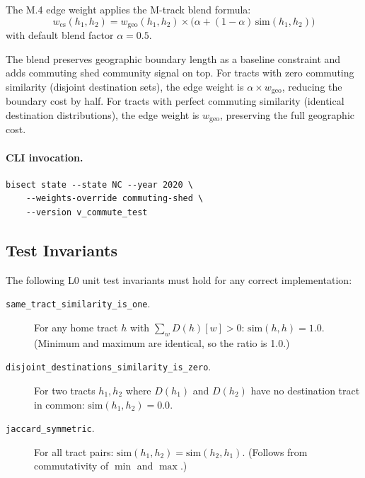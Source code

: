 The M.4 edge weight applies the M-track blend formula:
\begin{equation}
  w_{\mathrm{cs}}(h_1, h_2)
  = w_{\mathrm{geo}}(h_1, h_2) \times
    \bigl(\alpha + (1 - \alpha)\,\mathrm{sim}(h_1, h_2)\bigr)
  \label{eq:weight}
\end{equation}
with default blend factor $\alpha = 0.5$.

The blend preserves geographic boundary length as a baseline constraint and
adds commuting shed community signal on top.
For tracts with zero commuting similarity (disjoint destination sets),
the edge weight is $\alpha \times w_{\mathrm{geo}}$, reducing the boundary
cost by half.
For tracts with perfect commuting similarity (identical destination
distributions), the edge weight is $w_{\mathrm{geo}}$, preserving the
full geographic cost.

\paragraph{CLI invocation.}
\begin{verbatim}
bisect state --state NC --year 2020 \
    --weights-override commuting-shed \
    --version v_commute_test
\end{verbatim}

\subsection{Test Invariants}

The following L0 unit test invariants must hold for any correct implementation:

\begin{description}
  \item[\texttt{same\_tract\_similarity\_is\_one}.]
    For any home tract $h$ with $\sum_w D(h)[w] > 0$:
    $\mathrm{sim}(h, h) = 1.0$.
    (Minimum and maximum are identical, so the ratio is 1.0.)
  \item[\texttt{disjoint\_destinations\_similarity\_is\_zero}.]
    For two tracts $h_1, h_2$ where $D(h_1)$ and $D(h_2)$ have no
    destination tract in common: $\mathrm{sim}(h_1, h_2) = 0.0$.
  \item[\texttt{jaccard\_symmetric}.]
    For all tract pairs: $\mathrm{sim}(h_1, h_2) = \mathrm{sim}(h_2, h_1)$.
    (Follows from commutativity of $\min$ and $\max$.)
\end{description}
